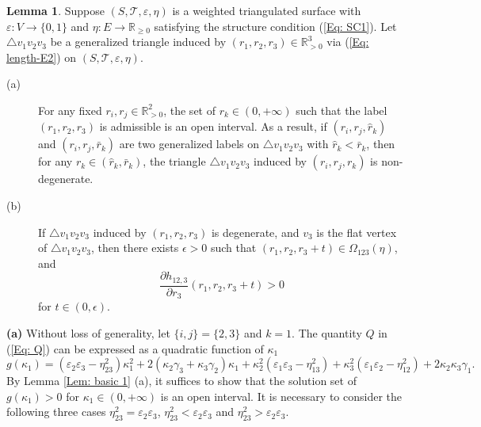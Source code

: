 \documentclass[12pt]{amsart}
\theoremstyle{definition}
\newtheorem{lemma}[theorem]{Lemma}
\begin{document}
\begin{lemma}\label{Lem: interval}
Suppose $(S,\mathcal{T},\varepsilon,\eta)$ is a weighted triangulated surface with $\varepsilon: V\rightarrow \{0,1\}$ and $\eta: E\rightarrow \mathbb{R}_{\geq 0}$ satisfying the structure condition (\ref{Eq: SC1}).
Let $\triangle v_1v_2v_3$ be a generalized triangle induced by $(r_1,r_2,r_3)\in\mathbb{R}^3_{>0}$ via (\ref{Eq: length-E2}) on $(S,\mathcal{T},\varepsilon,\eta)$.
\begin{description}
\item[(a)]
For any fixed $r_i, r_j\in \mathbb{R}^2_{>0}$,
the set of $r_k\in (0, +\infty)$ such that the label $(r_1,r_2,r_3)$ is admissible is an open interval.
As a result, if $(r_i, r_j,\hat{r}_k)$ and $(r_i, r_j,\bar{r}_k)$ are two generalized labels on $\triangle v_1v_2v_3$ with $\hat{r}_k<\bar{r}_k$,
then for any $r_k\in (\hat{r}_k,\bar{r}_k)$,
the triangle $\triangle v_1v_2v_3$ induced by $(r_i, r_j, r_k)$ is non-degenerate.

\item[(b)]
If $\triangle v_1v_2v_3$ induced by $(r_1,r_2,r_3)$ is degenerate, and $v_3$ is the flat vertex of $\triangle v_1v_2v_3$,
then there exists $\epsilon>0$ such that $(r_1,r_2,r_3+t)\in \Omega_{123}(\eta)$, and
\begin{equation*}
\frac{\partial h_{12,3}}{\partial r_3}(r_1, r_2, r_3+t)>0
\end{equation*}
for $t\in (0, \epsilon)$.
\end{description}
\end{lemma}
\proof 
\textbf{(a)}
Without loss of generality, let $\{i,j\}=\{2,3\}$ and $k=1$. 
The quantity $Q$ in (\ref{Eq: Q}) can be expressed as a quadratic function of $\kappa_1$
\begin{equation*}
g(\kappa_1)
=(\varepsilon_2\varepsilon_3-\eta^2_{23})\kappa_1^2
+2(\kappa_2\gamma_{3}+\kappa_3\gamma_{2})\kappa_1
+\kappa_2^2(\varepsilon_1\varepsilon_3-\eta^2_{13})
+\kappa_3^2(\varepsilon_1\varepsilon_2-\eta^2_{12})
+2\kappa_2\kappa_3\gamma_{1}.
\end{equation*}
By Lemma \ref{Lem: basic 1} (a), it suffices to show that the solution set of $g(\kappa_1)>0$ for $\kappa_1\in (0, +\infty)$ is an open interval. It is necessary to consider the following three cases $\eta^2_{23}=\varepsilon_2\varepsilon_3$, $\eta^2_{23}<\varepsilon_2\varepsilon_3$ and $\eta^2_{23}>\varepsilon_2\varepsilon_3$.
\end{document}
